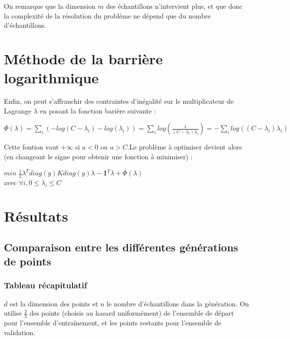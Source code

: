 \documentclass{article}
\begin{document}
On remarque que la dimension $m$ des échantillons n'intervient plus, et que donc la complexité de la résolution du problème ne dépend que du nombre d'échantillons. 

\section{Méthode de la barrière logarithmique}

Enfin, on peut s'affranchir des contraintes d'inégalité sur le multiplicateur de Lagrange $\lambda$ en posant la fonction barière suivante :\\

          \begin{center}
          $\Phi(\lambda) = \sum_i (- log(C - \lambda_i) - log(\lambda_i)) = \sum_i log(\frac{1}{(C - \lambda_i)\lambda_i}) = - \sum_i log((C - \lambda_i)\lambda_i)$ 
          \end{center}

Cette fontion vaut $+\infty$ si $a<0$ ou $a>C$.Le problème à optimiser devient alors (en changeant le signe pour obtenir une fonction à minimiser) :\\

          \begin{center}
                 $min$ $\frac{1}{2}\lambda^Tdiag(y)Kdiag(y)\lambda-$\textbf{1}$^T\lambda +\Phi(\lambda)$\\
                 avec $\forall i, 0 \leq \lambda_i \leq C$ 
                 \end{center}
\section{Résultats}

\subsection{Comparaison entre les différentes générations de points}

\subsubsection{Tableau récapitulatif}

$d$ est la dimension des points et $n$ le nombre d'échantillons dans la génération. On utilise $\frac{2}{3}$ des points (choisis au hasard uniformément) de l'ensemble de départ pour l'ensemble d'entraînement, et les points restants pour l'ensemble de validation. \\
\end{document}
